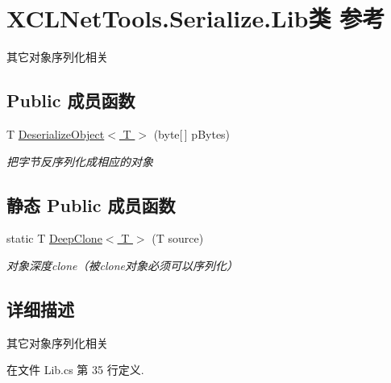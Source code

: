 \hypertarget{class_x_c_l_net_tools_1_1_serialize_1_1_lib}{\section{X\-C\-L\-Net\-Tools.\-Serialize.\-Lib类 参考}
\label{class_x_c_l_net_tools_1_1_serialize_1_1_lib}
}


其它对象序列化相关  


\subsection*{Public 成员函数}
\begin{DoxyCompactItemize}
\item 
T \hyperlink{class_x_c_l_net_tools_1_1_serialize_1_1_lib_ae2d400cea76a1f11f5141deab7c6d2b1}{Deserialize\-Object$<$ T $>$} (byte\mbox{[}$\,$\mbox{]} p\-Bytes)
\begin{DoxyCompactList}\small\item\em 把字节反序列化成相应的对象 \end{DoxyCompactList}\end{DoxyCompactItemize}
\subsection*{静态 Public 成员函数}
\begin{DoxyCompactItemize}
\item 
static T \hyperlink{class_x_c_l_net_tools_1_1_serialize_1_1_lib_ad38f60aaa57643027af6ebc86ef7fe18}{Deep\-Clone$<$ T $>$} (T source)
\begin{DoxyCompactList}\small\item\em 对象深度clone（被clone对象必须可以序列化） \end{DoxyCompactList}\end{DoxyCompactItemize}


\subsection{详细描述}
其它对象序列化相关 



在文件 Lib.\-cs 第 35 行定义.



